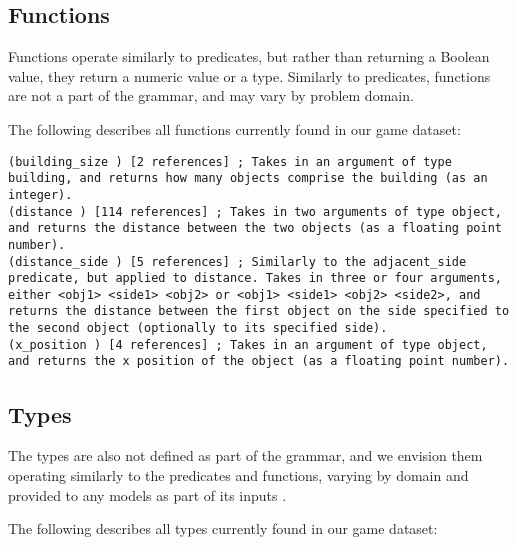 \documentclass{article}
\begin{document}
\subsection{Functions} \label{sec:functions}
Functions operate similarly to predicates, but rather than returning a Boolean value, they return a numeric value or a type. 
Similarly to predicates, functions are not a part of the grammar, and may vary by problem domain. 

The following describes all functions currently found in our game dataset:
\begin{lstlisting}
(building_size ) [2 references] ; Takes in an argument of type building, and returns how many objects comprise the building (as an integer).
(distance ) [114 references] ; Takes in two arguments of type object, and returns the distance between the two objects (as a floating point number).
(distance_side ) [5 references] ; Similarly to the adjacent_side predicate, but applied to distance. Takes in three or four arguments, either <obj1> <side1> <obj2> or <obj1> <side1> <obj2> <side2>, and returns the distance between the first object on the side specified to the second object (optionally to its specified side).
(x_position ) [4 references] ; Takes in an argument of type object, and returns the x position of the object (as a floating point number).
\end{lstlisting}



\subsection{Types} \label{sec:types}
The types are also not defined as part of the grammar, and we envision them operating similarly to the predicates and functions, varying by domain and provided to any models as part of its inputs .
            
The following describes all types currently found in our game dataset: 
        
\end{document}
